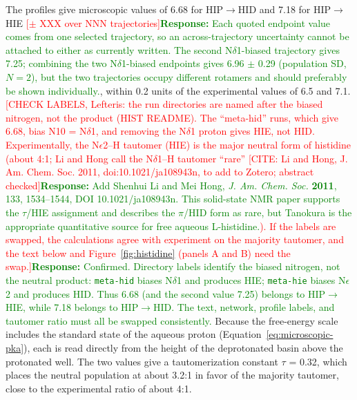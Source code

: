 The profiles give microscopic \pka{} values of 6.68 for HIP$\rightarrow$HID and 7.18 for HIP$\rightarrow$HIE \textcolor{red}{[$\pm$ XXX over NNN trajectories]}\textcolor{green}{\textbf{Response:} Each quoted endpoint value comes from one selected trajectory, so an across-trajectory uncertainty cannot be attached to either as currently written. The second N$\delta$1-biased trajectory gives 7.25; combining the two N$\delta$1-biased endpoints gives 6.96 $\pm$ 0.29 (population SD, $N=2$), but the two trajectories occupy different rotamers and should preferably be shown individually.}, within 0.2 units of the experimental values of 6.5 and 7.1.\cite{kyte_structure_2006} \textcolor{red}{[CHECK LABELS, Lefteris: the run directories are named after the biased nitrogen, not the product (HIST README).
The ``meta-hid'' runs, which give 6.68, bias N10 = N$\delta$1, and removing the N$\delta$1 proton gives HIE, not HID.
Experimentally, the N$\epsilon$2--H tautomer (HIE) is the major neutral form of histidine (about 4:1; Li and Hong call the N$\delta$1--H tautomer ``rare'' \textcolor{red}{[CITE: Li and Hong, J.
Am.
Chem.
Soc. 2011, doi:10.1021/ja108943n, to add to Zotero; abstract checked]}\textcolor{green}{\textbf{Response:} Add Shenhui Li and Mei Hong, \emph{J. Am. Chem. Soc.} \textbf{2011}, 133, 1534--1544, DOI 10.1021/ja108943n. This solid-state NMR paper supports the $\tau$/HIE assignment and describes the $\pi$/HID form as rare, but Tanokura is the appropriate quantitative source for free aqueous L-histidine.}).
If the labels are swapped, the calculations agree with experiment on the majority tautomer, and the text below and Figure~\ref{fig:histidine} (panels A and B) need the swap.]}\textcolor{green}{\textbf{Response:} Confirmed. Directory labels identify the biased nitrogen, not the neutral product: \texttt{meta-hid} biases N$\delta$1 and produces HIE; \texttt{meta-hie} biases N$\epsilon$2 and produces HID. Thus 6.68 (and the second value 7.25) belongs to HIP$\rightarrow$HIE, while 7.18 belongs to HIP$\rightarrow$HID. The text, network, profile labels, and tautomer ratio must all be swapped consistently.} Because the free-energy scale includes the standard state of the aqueous proton (Equation~\ref{eq:microscopic-pka}), each \pka{} is read directly from the height of the deprotonated basin above the protonated well.
The two values give a tautomerization constant $\tau$ = 0.32, which places the neutral population at about 3.2:1 in favor of the majority tautomer, close to the experimental ratio of about 4:1.
